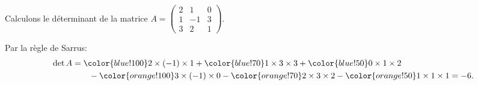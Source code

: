 \documentclass[class=report,crop=false]{standalone}
\begin{document}
%
%




\begin{exemple}
Calculons le déterminant de la matrice
$A =
\begin{pmatrix}
 2 & 1  & 0\\
 1 & -1 & 3\\
 3 & 2  & 1
\end{pmatrix}
$.

Par la règle de Sarrus:
\begin{align*}
\det A 
&= {\color{blue!100} 2\times (-1) \times 1 }
+{\color{blue!70} 1\times 3 \times  3 }
+{\color{blue!50} 0\times 1 \times 2 }\\
&\qquad -{\color{orange!100} 3\times (-1) \times 0 }
-{\color{orange!70} 2\times 3 \times 2 }
-{\color{orange!50} 1\times 1 \times 1 }
= -6.  
\end{align*}




\end{exemple}
\end{document}
